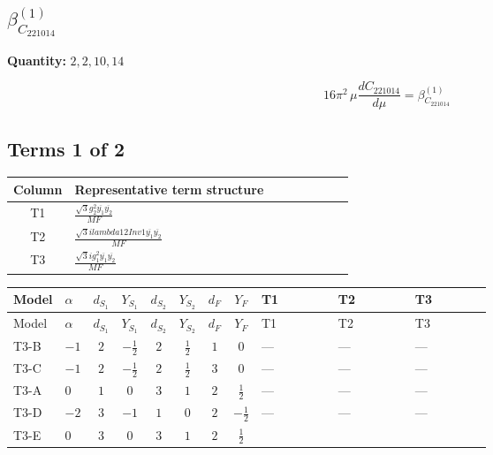 \documentclass[8pt]{article}
\begin{document}
\begin{landscape}
\section*{$\beta_{C_{221014}}^{(1)}$}
\noindent\textbf{Quantity: }$\mathrm{2,2,10,14}$\par\smallskip
\[16\pi^2\,\mu\frac{d C_{221014}}{d\mu}=\beta_{C_{221014}}^{(1)}\]
\subsection*{Terms 1 of 2}
\begin{center}
\begin{tabular}{@{}c >{\raggedright\arraybackslash}p{0.82\linewidth}@{}}
\toprule
Column & Representative term structure \\
\midrule
T1 & \(\displaystyle \frac{\sqrt{3} g_{2}^{2} \overline{y_{1}} \overline{y_{2}}}{MF}\) \\
\midrule
T2 & \(\displaystyle \frac{\sqrt{3} i lambda12Inv1 \overline{y_{1}} \overline{y_{2}}}{MF}\) \\
\midrule
T3 & \(\displaystyle \frac{\sqrt{3} i g_{1}^{2} \overline{y_{1}} \overline{y_{2}}}{MF}\) \\
\midrule
\bottomrule
\end{tabular}
\end{center}
\smallskip
\tiny
\begin{longtable}{@{}llcccccc >{\raggedright\arraybackslash}p{0.21\linewidth} >{\raggedright\arraybackslash}p{0.21\linewidth} >{\raggedright\arraybackslash}p{0.21\linewidth}@{}}
\toprule
Model & $\alpha$ & $d_{S_1}$ & $Y_{S_1}$ & $d_{S_2}$ & $Y_{S_2}$ & $d_F$ & $Y_F$ & T1 & T2 & T3 \\
\midrule
\endfirsthead
\toprule
Model & $\alpha$ & $d_{S_1}$ & $Y_{S_1}$ & $d_{S_2}$ & $Y_{S_2}$ & $d_F$ & $Y_F$ & T1 & T2 & T3 \\
\midrule
\endhead
T3-B & $-1$ & $2$ & $-\frac{1}{2}$ & $2$ & $\frac{1}{2}$ & $1$ & $0$ & --- & --- & --- \\
\midrule
T3-C & $-1$ & $2$ & $-\frac{1}{2}$ & $2$ & $\frac{1}{2}$ & $3$ & $0$ & --- & --- & --- \\
\midrule
T3-A & $0$ & $1$ & $0$ & $3$ & $1$ & $2$ & $\frac{1}{2}$ & --- & --- & --- \\
\midrule
T3-D & $-2$ & $3$ & $-1$ & $1$ & $0$ & $2$ & $-\frac{1}{2}$ & --- & --- & --- \\
\midrule
T3-E & $0$ & $3$ & $0$ & $3$ & $1$ & $2$ & $\frac{1}{2}$ & \scriptsize\adjustbox{max width=\linewidth}{$\begin{gathered} - \frac{\sqrt{3} g_{2}^{2} \overline{y_{1}} \overline{y_{2}}}{6 MF}\end{gathered}$} & \scriptsize\adjustbox{max width=\linewidth}{$\begin{gathered} - \frac{\sqrt{3} i lambda12Inv1 \overline{y_{1}} \overline{y_{2}}}{6 MF}\end{gathered}$} & \scriptsize\adjustbox{max width=\linewidth}{$\begin{gathered} \frac{\sqrt{3} i g_{1}^{2} \overline{y_{1}} \overline{y_{2}}}{8 MF}\end{gathered}$} \\

\end{longtable}
\end{landscape}
\end{document}
